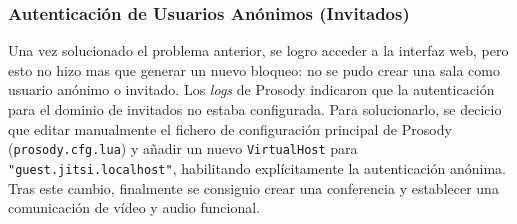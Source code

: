 \subsubsection{Autenticación de Usuarios Anónimos (Invitados)}
Una vez solucionado el problema anterior, se logro acceder a la interfaz web, pero esto no hizo mas que generar un nuevo bloqueo: no se pudo crear una sala como usuario anónimo o invitado. Los \textit{logs} de Prosody indicaron que la autenticación para el dominio de invitados no estaba configurada. Para solucionarlo, se decicio que editar manualmente el fichero de configuración principal de Prosody (\texttt{prosody.cfg.lua}) y añadir un nuevo \texttt{VirtualHost} para \texttt{"guest.jitsi.localhost"}, habilitando explícitamente la autenticación anónima. Tras este cambio, finalmente se consiguio crear una conferencia y establecer una comunicación de vídeo y audio funcional.

